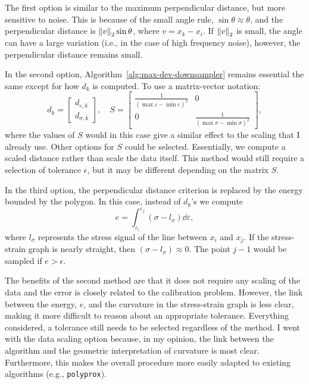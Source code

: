 \documentclass[a4paper,11pt]{article}
\begin{document}
The first option is similar to the maximum perpendicular distance, but more sensitive to noise.
This is because of the small angle rule, $\sin \theta \approx \theta$, and the perpendicular distance is $\norm{v}_2 \sin \theta$, where $v = x_k - x_i$.
If $\norm{v}_2$ is small, the angle can have a large variation (i.e., in the case of high frequency noise), however, the perpendicular distance remains small.

In the second option, Algorithm~\ref{alg:max-dev-downsampler} remains essential the same except for how $d_k$ is computed.
To use a matrix-vector notation:
\begin{equation*}
    d_k = \begin{bmatrix}
        d_{\varepsilon,k} \\
        d_{\sigma,k}
    \end{bmatrix}, \quad
    S = \begin{bmatrix}
        \frac{1}{(\max \varepsilon - \min \varepsilon)^2} & 0 \\
        0 & \frac{1}{(\max \sigma - \min \sigma)^2}
    \end{bmatrix},
\end{equation*}
where the values of $S$ would in this case give a similar effect to the scaling that I already use.
Other options for $S$ could be selected.
Essentially, we compute a scaled distance rather than scale the data itself.
This method would still require a selection of tolerance $\epsilon$, but it may be different depending on the matrix $S$.

In the third option, the perpendicular distance criterion is replaced by the energy bounded by the polygon.
In this case, instead of $d_k$'s we compute
\begin{equation*}
    e = \int_{\varepsilon_i}^{\varepsilon_j} (\sigma - l_\sigma) \dd \varepsilon,
\end{equation*}
where $l_\sigma$ represents the stress signal of the line between $x_i$ and $x_j$.
If the stress-strain graph is nearly straight, then $(\sigma - l_\sigma) \approx 0$.
The point $j-1$ would be sampled if $e > \epsilon$.

The benefits of the second method are that it does not require any scaling of the data and the error is closely related to the calibration problem.
However, the link between the energy, $e$, and the curvature in the stress-strain graph is less clear, making it more difficult to reason about an appropriate tolerance.
Everything considered, a tolerance still needs to be selected regardless of the method.
I went with the data scaling option because, in my opinion, the link between the algorithm and the geometric interpretation of curvature is most clear.
Furthermore, this makes the overall procedure more easily adapted to existing algorithms (e.g., \texttt{polyprox}).
\end{document}
